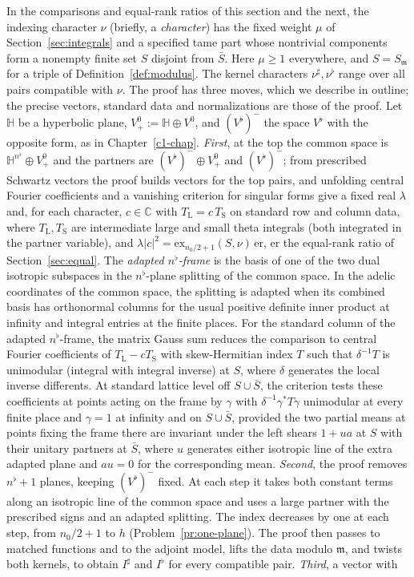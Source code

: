 \documentclass[reqno]{amsart}
\newcounter{chap}
\theoremstyle{definition}
\theoremstyle{plain}
\newcommand{\C}{\mathbb C}
\newcommand{\ex}{\mathrm{ex}}
\newcommand{\Vb}{V^\flat}
\newcommand{\nb}{n^\flat}
\begin{document}
In the comparisons and equal-rank ratios of this section and the next, the indexing character \(\nu\) (briefly, a \emph{character}) has the fixed weight \(\mu\) of Section~\ref{sec:integrals} and a specified tame part whose nontrivial components form a nonempty finite set \(S\) disjoint from \(\bar S\).  Here \(\mu \ge 1\) everywhere, and \(S = S_{\mathfrak m}\) for a triple of Definition~\ref{def:modulus}.  The kernel characters \(\nu^\sharp, \nu^\flat\) range over all pairs compatible with \(\nu\).  The proof has three moves, which we describe in outline; the precise vectors, standard data and normalizations are those of the proof.  Let \(\mathbb H\) be a hyperbolic plane, \(V^0_+ := \mathbb H \oplus V^0\), and \((\Vb)^-\) the space \(\Vb\) with the opposite form, as in Chapter~\ref{c1-chap}.  \emph{First}, at the top the common space is \(\mathbb H^{\nb} \oplus V^0_+\) and the partners are \((\Vb)^- \oplus V^0_+\) and \((\Vb)^-\); from prescribed Schwartz vectors the proof builds vectors for the top pairs, and unfolding central Fourier coefficients and a vanishing criterion for singular forms give a fixed real \(\lambda\) and, for each character, \(c \in \C\) with \(T_{\mathrm L} = c\,T_{\mathrm S}\) on standard row and column data, where \(T_{\mathrm L}, T_{\mathrm S}\) are intermediate large and small theta integrals (both integrated in the partner variable), and \(\lambda\lvert c\rvert^2 = \ex_{n_0/2+1}(S,\nu)\,\mathrm{er}\), \(\mathrm{er}\) the equal-rank ratio of Section~\ref{sec:equal}.  The \emph{adapted \(\nb\)-frame} is the basis of one of the two dual isotropic subspaces in the \(\nb\)-plane splitting of the common space.  In the adelic coordinates of the common space, the splitting is adapted when its combined basis has orthonormal columns for the usual positive definite inner product at infinity and integral entries at the finite places.  For the standard column of the adapted \(\nb\)-frame, the matrix Gauss sum reduces the comparison to central Fourier coefficients of \(T_{\mathrm L} - c T_{\mathrm S}\) with skew-Hermitian index \(T\) such that \(\delta^{-1}T\) is unimodular (integral with integral inverse) at \(S\), where \(\delta\) generates the local inverse differents.  At standard lattice level off \(S \cup \bar S\), the criterion tests these coefficients at points acting on the frame by \(\gamma\) with \(\delta^{-1}\gamma^*T\gamma\) unimodular at every finite place and \(\gamma = 1\) at infinity and on \(S \cup \bar S\), provided the two partial means at points fixing the frame there are invariant under the left shears \(1 + ua\) at \(S\) with their unitary partners at \(\bar S\), where \(u\) generates either isotropic line of the extra adapted plane and \(au = 0\) for the corresponding mean.  \emph{Second}, the proof removes \(\nb+1\) planes, keeping \((\Vb)^-\) fixed.  At each step it takes both constant terms along an isotropic line of the common space and uses a large partner with the prescribed signs and an adapted splitting.  The index decreases by one at each step, from \(n_0/2+1\) to \(h\) (Problem~\ref{pr:one-plane}).  The proof then passes to matched functions and to the adjoint model, lifts the data modulo \(\mathfrak m\), and twists both kernels, to obtain \(I^\sharp\) and \(I^\flat\) for every compatible pair.  \emph{Third}, a vector with 
\end{document}

